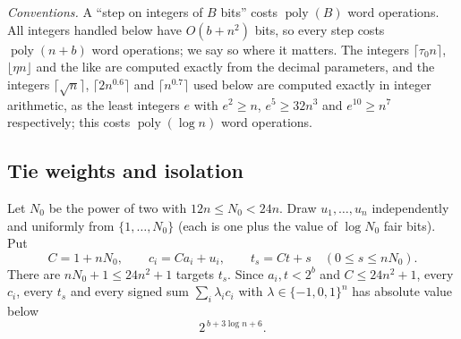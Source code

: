 \documentclass[11pt]{article}
\theoremstyle{definition}
\newcommand{\floor}[1]{\lfloor #1\rfloor}
\newcommand{\ceil}[1]{\lceil #1\rceil}
\newcommand{\poly}{\operatorname{poly}}
\begin{document}
\emph{Conventions.} A ``step on integers of $B$ bits'' costs $\poly(B)$ word operations. All integers handled below
have $O(b+n^2)$ bits, so every step costs $\poly(n+b)$ word operations; we say so where it matters.
The integers $\ceil{\tau_0n}$, $\floor{\eta n}$ and the like are computed exactly from the decimal parameters, and
the integers $\ceil{\sqrt n}$, $\ceil{2n^{0.6}}$ and $\ceil{n^{0.7}}$ used below are computed exactly in integer
arithmetic, as the least integers $e$ with $e^2\ge n$, $e^5\ge32n^3$ and $e^{10}\ge n^7$ respectively; this costs
$\poly(\log n)$ word operations.

\subsection{Tie weights and isolation}
Let $N_0$ be the power of two with $12n\le N_0<24n$. Draw $u_1,\dots,u_n$ independently and uniformly from
$\{1,\dots,N_0\}$ (each is one plus the value of $\log N_0$ fair bits). Put
\begin{equation}\label{eq:transform}
 C=1+nN_0,\qquad c_i=Ca_i+u_i,\qquad t_s=Ct+s\quad(0\le s\le nN_0).
\end{equation}
There are $nN_0+1\le24n^2+1$ targets $t_s$. Since $a_i,t<2^b$ and $C\le24n^2+1$, every $c_i$, every $t_s$ and every
signed sum $\sum_i\lambda_ic_i$ with $\lambda\in\{-1,0,1\}^n$ has absolute value below
\begin{equation}\label{eq:bits}
 2^{\,b+3\log n+6}.
\end{equation}
\end{document}
